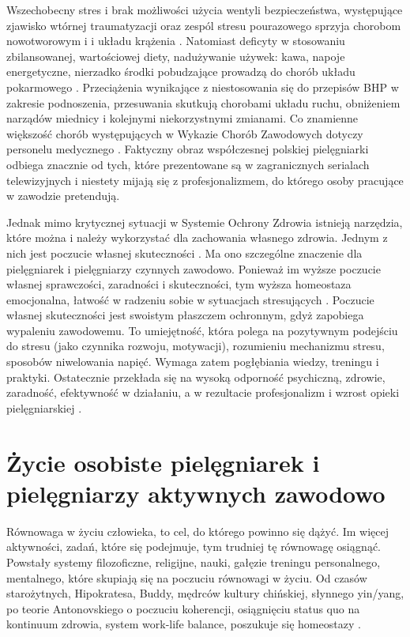 \documentclass[a4paper,12pt,twoside,openany]{report}
\begin{document}
Wszechobecny stres i brak możliwości użycia wentyli bezpieczeństwa, występujące zjawisko wtórnej traumatyzacji oraz zespól stresu pourazowego sprzyja chorobom nowotworowym i i układu krążenia \cite{skutki}. Natomiast deficyty w stosowaniu zbilansowanej, wartościowej diety, nadużywanie używek: kawa, napoje energetyczne, nierzadko środki pobudzające prowadzą do chorób układu pokarmowego \cite{p.p}. Przeciążenia wynikające z niestosowania się do przepisów BHP w zakresie podnoszenia, przesuwania skutkują chorobami układu ruchu, obniżeniem narządów miednicy i kolejnymi niekorzystnymi zmianami. Co znamienne większość chorób występujących w Wykazie Chorób Zawodowych dotyczy personelu medycznego \cite{wykaz}. Faktyczny obraz współczesnej polskiej pielęgniarki odbiega znacznie od tych, które prezentowane są w zagranicznych serialach telewizyjnych i niestety mijają się z profesjonalizmem, do którego osoby pracujące w zawodzie pretendują.

Jednak mimo krytycznej sytuacji w Systemie Ochrony Zdrowia istnieją narzędzia, które można i należy wykorzystać dla zachowania własnego zdrowia. Jednym z nich jest poczucie własnej skuteczności \cite{skuteczność}. Ma ono szczególne znaczenie dla pielęgniarek i pielęgniarzy czynnych zawodowo. Ponieważ im wyższe poczucie własnej sprawczości, zaradności i skuteczności, tym wyższa homeostaza emocjonalna, łatwość w radzeniu sobie w sytuacjach stresujących \cite{salutogeneza}. Poczucie własnej skuteczności jest swoistym płaszczem ochronnym, gdyż zapobiega wypaleniu zawodowemu. To umiejętność, która polega na pozytywnym podejściu do stresu (jako czynnika rozwoju, motywacji), rozumieniu mechanizmu stresu, sposobów niwelowania napięć. Wymaga zatem pogłębiania wiedzy, treningu i praktyki. Ostatecznie przekłada się na wysoką odporność psychiczną, zdrowie, zaradność, efektywność w działaniu, a w rezultacie profesjonalizm i wzrost opieki pielęgniarskiej \cite{stres}.

\section{Życie osobiste pielęgniarek i pielęgniarzy \newline aktywnych zawodowo}
\label{sectionZycieOsobiste}
Równowaga w życiu człowieka, to cel, do którego powinno się dążyć. Im więcej aktywności, zadań, które się podejmuje, tym trudniej tę równowagę osiągnąć. Powstały systemy filozoficzne, religijne, nauki, gałęzie treningu personalnego, mentalnego, które skupiają się na poczuciu równowagi w życiu. Od czasów starożytnych, Hipokratesa, Buddy, mędrców kultury chińskiej, słynnego yin/yang, po teorie Antonovskiego o poczuciu koherencji, osiągnięciu status quo na kontinuum zdrowia, system work-life balance, poszukuje się homeostazy \cite{salutogeneza}.
\end{document}
